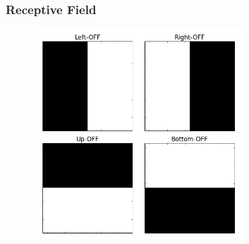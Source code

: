 \documentclass{beamer}
\begin{document}
\begin{frame}
 \frametitle{Receptive Field}

\begin{figure}
 \includegraphics[width = 0.7\textwidth]{figures/recRFs.png}
 \end{figure}

\end{frame}



%
%
%
%
%
%
%
%
\end{document}

